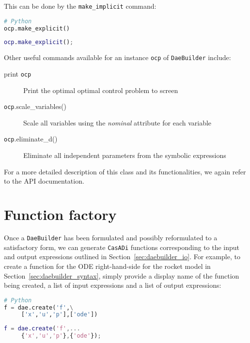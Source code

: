 \documentclass[a4paper,12pt]{book}
\newcommand{\CasADi}{\texttt{CasADi}\xspace}
\newcommand{\python}[1]{\lstinline[language=Python]{#1}}
\begin{document}
This can be done by the \python{make_implicit} command:

\begin{minipage}[t]{0.5\textwidth}
\begin{lstlisting}[language=Python]
# Python
ocp.make_explicit()
\end{lstlisting}
\end{minipage}
\begin{minipage}[t]{0.5\textwidth}
\begin{lstlisting}[language=Matlab]
% MATLAB/Octave
ocp.make_explicit();
\end{lstlisting}
\end{minipage}


Other useful commands available for an instance \texttt{ocp} of \texttt{DaeBuilder} include:
\begin{description}
\item[print \texttt{ocp}] Print the optimal optimal control problem to screen
\item[\texttt{ocp}.scale\_variables()] Scale all variables using the \emph{nominal} attribute for each variable
\item[\texttt{ocp}.eliminate\_d()] Eliminate all independent parameters from the symbolic expressions
\end{description}

For a more detailed description of this class and its functionalities, we again
refer to the API documentation.

\section{Function factory}
Once a \texttt{DaeBuilder} has been formulated and possibly reformulated to
a satisfactory form, we can generate \CasADi functions corresponding to the
input and output expressions outlined in Section~\ref{sec:daebuilder_io}.
For example, to create a function for the ODE right-hand-side for the rocket
model in Section~\ref{sec:daebuilder_syntax}, simply provide a display
name of the function being created, a list of input expressions
and a list of output expressions:

\begin{minipage}[t]{0.5\textwidth}
\begin{lstlisting}[language=Python]
# Python
f = dae.create('f',\
     ['x','u','p'],['ode'])
\end{lstlisting}
\end{minipage}
\begin{minipage}[t]{0.5\textwidth}
\begin{lstlisting}[language=Matlab]
% MATLAB/Octave
f = dae.create('f',...
     {'x','u','p'},{'ode'});
\end{lstlisting}
\end{minipage}
\end{document}
